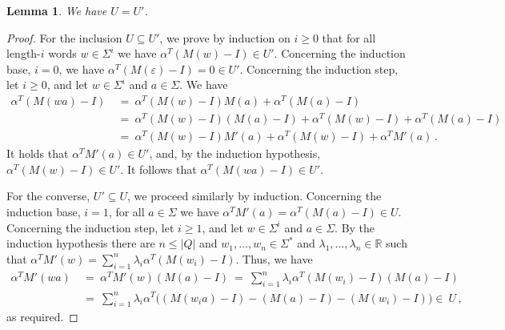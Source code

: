 \documentclass[11pt,a4paper]{amsart}
\theoremstyle{plain}
\newtheorem{lem}[thm]{Lemma}
\theoremstyle{definition}
\theoremstyle{defC}
\theoremstyle{thmC}
\theoremstyle{plain}
\numberwithin{equation}{section}
\begin{document}
\begin{lem} \label{lem:U=U'}
We have $U = U'$.
\end{lem}
\begin{proof}
For the inclusion $U \subseteq U'$, we prove by induction on $i \ge 0$ that for all length-$i$ words $w \in \Sigma^i$ we have $\alpha^T (M(w) - I) \in U'$.
Concerning the induction base, $i=0$, we have $\alpha^T (M(\varepsilon) - I) = 0 \in U'$.
Concerning the induction step, let $i \ge 0$, and let $w \in \Sigma^i$ and $a \in \Sigma$.
We have
\begin{align*}
\alpha^T (M(w a) - I)
\ &= \ \alpha^T (M(w) - I) M(a) + \alpha^T (M(a) - I) \\
\ &= \ \alpha^T (M(w) - I) (M(a) - I) + \alpha^T (M(w) - I) + \alpha^T (M(a) - I) \\
\ &= \ \alpha^T (M(w) - I) M'(a) + \alpha^T (M(w) - I) + \alpha^T M'(a)\,.
\end{align*}
It holds that $\alpha^T M'(a) \in U'$, and, by the induction hypothesis, $\alpha^T (M(w) - I) \in U'$.
It follows that $\alpha^T (M(w a) - I) \in U'$.

For the converse, $U' \subseteq U$, we proceed similarly by induction.
Concerning the induction base, $i=1$, for all $a \in \Sigma$ we have $\alpha^T M'(a) = \alpha^T (M(a) - I) \in U$.
Concerning the induction step, let $i \ge 1$, and let $w \in \Sigma^i$ and $a \in \Sigma$.
By the induction hypothesis there are $n \le |Q|$ and $w_1, \ldots, w_n \in \Sigma^*$ and $\lambda_1, \ldots, \lambda_n \in \mathbb{R}$ such that $\alpha^T M'(w) = \sum_{i=1}^n \lambda_i \alpha^T (M(w_i) - I)$.
Thus, we have
\begin{align*}
\alpha^T M'(w a)
\ &= \ \alpha^T M'(w) (M(a) - I) 
\ = \ \sum_{i=1}^n \lambda_i \alpha^T (M(w_i) - I) (M(a) - I) \\
\ &= \ \sum_{i=1}^n \lambda_i \alpha^T \big((M(w_i a) - I) - (M(a) - I) - (M(w_i) - I) \big) \in \ U\,,
\end{align*}
as required.
\end{proof}
\end{document}
